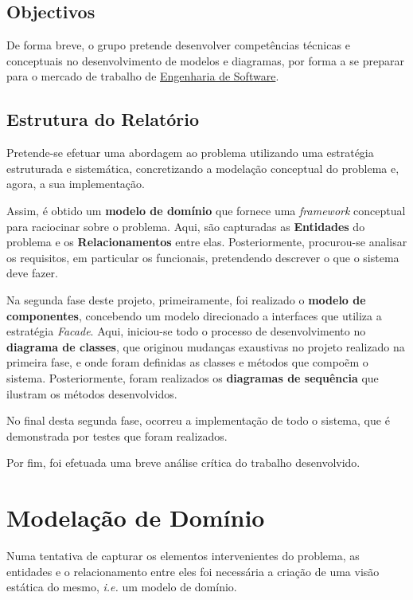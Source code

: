 \documentclass[a4paper,12pt]{scrreprt}
\begin{document}
\section{Objectivos}
De forma breve, o grupo pretende desenvolver competências técnicas e conceptuais no desenvolvimento de modelos e diagramas,
por forma a se preparar para o mercado de trabalho de \underline{Engenharia de Software}.


\section{Estrutura do Relatório}
Pretende-se efetuar uma abordagem ao problema utilizando uma estratégia estruturada e sistemática, concretizando a modelação conceptual do problema 
e, agora, a sua implementação.

Assim, é obtido um \textbf{modelo de domínio} que fornece uma \textit{framework} conceptual para raciocinar sobre o problema.
Aqui, são capturadas as \textbf{Entidades} do problema e os \textbf{Relacionamentos} entre elas. Posteriormente, procurou-se analisar os 
requisitos, em particular os funcionais, pretendendo descrever o que o sistema deve fazer.

Na segunda fase deste projeto, primeiramente, foi realizado o \textbf{modelo de componentes}, concebendo um modelo direcionado a interfaces que utiliza
a estratégia \textit{Facade}. Aqui, iniciou-se todo o processo de desenvolvimento no \textbf{diagrama de classes}, que originou mudanças exaustivas no projeto 
realizado na primeira fase, e onde foram definidas as classes e métodos que compoẽm o sistema. Posteriormente, foram realizados os \textbf{diagramas de sequência} 
que ilustram os métodos desenvolvidos.

No final desta segunda fase, ocorreu a implementação de todo o sistema, que é demonstrada por testes que foram realizados.

Por fim, foi efetuada uma breve análise crítica do trabalho desenvolvido.


\chapter{Modelação de Domínio} \label{modelacao_dominio}
Numa tentativa de capturar os elementos intervenientes do problema, as entidades e o relacionamento entre eles foi necessária
a criação de uma visão estática do mesmo, \textit{i.e.} um modelo de domínio. 
\end{document}
